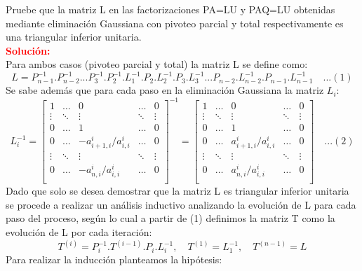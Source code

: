 Pruebe que la matriz L en las factorizaciones PA=LU y PAQ=LU obtenidas mediante eliminación Gaussiana con pivoteo parcial y total respectivamente es una triangular inferior unitaria.\\

\noindent \textcolor{red}{\bf Solución:}\\    

Para ambos casos (pivoteo parcial y total) la matriz L se define como:\\
\[L=P_{n-1}^{-1}.P_{n-2}^{-1}...P_{3}^{-1}.P_{2}^{-1}.L_1^{-1}.P_{2}.L_{2}^{-1}.P_{3}.L_{3}^{-1}...P_{n-2}.L_{n-2}^{-1}.P_{n-1}.L_{n-1}^{-1}\quad ...(1)\]
Se sabe además que para cada paso en la eliminación Gaussiana la matriz $L_i$:\\
\[L_i^{-1}=
\begin{bmatrix}
    1  & \dots & 0 & \dots & 0 \\
   \vdots  & \ddots & \vdots & \ddots & \vdots \\
   0  & \dots & 1 & \dots & 0 \\
   0  & \dots & -a_{i+1,i}^{i}/a_{i,i}^{i} & \dots & 0 \\
   \vdots  & \ddots & \vdots & \ddots & \vdots \\
   0  & \dots & -a_{n,i}^{i}/a_{i,i}^{i} & \dots & 0 \\
\end{bmatrix}^{-1}
=
\begin{bmatrix}
    1  & \dots & 0 & \dots & 0 \\
   \vdots  & \ddots & \vdots & \ddots & \vdots \\
   0  & \dots & 1 & \dots & 0 \\
   0  & \dots & a_{i+1,i}^{i}/a_{i,i}^{i} & \dots & 0 \\
   \vdots  & \ddots & \vdots & \ddots & \vdots \\
   0  & \dots & a_{n,i}^{i}/a_{i,i}^{i} & \dots & 0 \\
\end{bmatrix}\quad ...(2)
\]
Dado que solo se desea demostrar que la matriz L es triangular inferior unitaria se procede a realizar un análisis inductivo analizando la evolución de L para cada paso del proceso, según lo cual a partir de (1) definimos la matriz T como la evolución de L por cada iteración:\\
\[T^{(i)}=P_{i}^{-1}.T^{(i-1)}.P_{i}.L_{i}^{-1},\quad T^{(1)}=L_1^{-1},\quad T^{(n-1)}=L\]
Para realizar la inducción planteamos la hipótesis:\\

